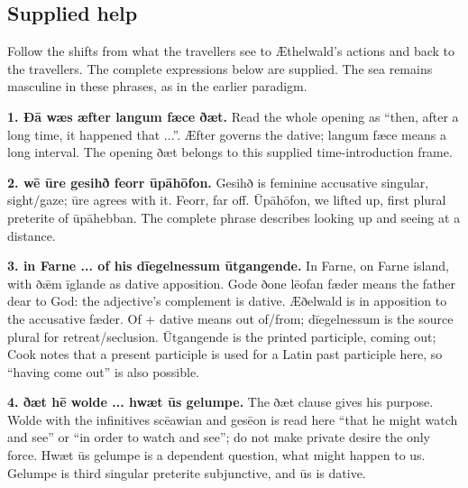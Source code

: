 \subsection*{Supplied help}

Follow the shifts from what the travellers see to Æthelwald’s actions and back to the travellers. The complete expressions below are supplied. The sea remains masculine in these phrases, as in the earlier paradigm.

\textbf{1. Ðā wæs æfter langum fæce ðæt.} Read the whole opening as “then, after a long time, it happened that ...”. Æfter governs the dative; langum fæce means a long interval. The opening ðæt belongs to this supplied time-introduction frame.

\textbf{2. wē ūre gesihð feorr ūpāhōfon.} Gesihð is feminine accusative singular, sight/\allowbreak{}gaze; ūre agrees with it. Feorr, far off. Ūpāhōfon, we lifted up, first plural preterite of ūpāhebban. The complete phrase describes looking up and seeing at a distance.

\textbf{3. in Farne ... of his dīegelnessum ūtgangende.} In Farne, on Farne island, with ðǣm īglande as dative apposition. Gode ðone lēofan fæder means the father dear to God: the adjective’s complement is dative. Æðelwald is in apposition to the accusative fæder. Of + dative means out of/\allowbreak{}from; dīegelnessum is the source plural for retreat/\allowbreak{}seclusion. Ūtgangende is the printed participle, coming out; Cook notes that a present participle is used for a Latin past participle here, so “having come out” is also possible.

\textbf{4. ðæt hē wolde ... hwæt ūs gelumpe.} The ðæt clause gives his purpose. Wolde with the infinitives scēawian and gesēon is read here “that he might watch and see” or “in order to watch and see”; do not make private desire the only force. Hwæt ūs gelumpe is a dependent question, what might happen to us. Gelumpe is third singular preterite subjunctive, and ūs is dative.

